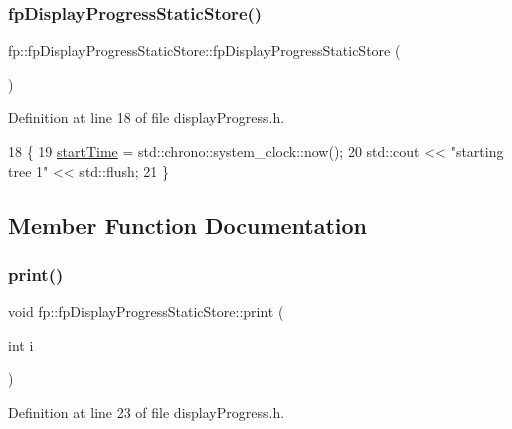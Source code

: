 \subsubsection{\texorpdfstring{fp\+Display\+Progress\+Static\+Store()}{fpDisplayProgressStaticStore()}}
{\footnotesize\ttfamily fp\+::fp\+Display\+Progress\+Static\+Store\+::fp\+Display\+Progress\+Static\+Store (\begin{DoxyParamCaption}{ }\end{DoxyParamCaption})\hspace{0.3cm}{\ttfamily [inline]}}



Definition at line 18 of file display\+Progress.\+h.


\begin{DoxyCode}
18                                           \{
19                 \hyperlink{classfp_1_1fpDisplayProgressStaticStore_aa602428554cc8543ec40617ffacd531d}{startTime} = std::chrono::system\_clock::now();
20                 std::cout << \textcolor{stringliteral}{"starting tree 1"} << std::flush;
21             \}
\end{DoxyCode}


\subsection{Member Function Documentation}
\mbox{\label{classfp_1_1fpDisplayProgressStaticStore_a9b2ab53929032183e681157515cf5313}} 
\subsubsection{\texorpdfstring{print()}{print()}}
{\footnotesize\ttfamily void fp\+::fp\+Display\+Progress\+Static\+Store\+::print (\begin{DoxyParamCaption}\item[{int}]{i }\end{DoxyParamCaption})\hspace{0.3cm}{\ttfamily [inline]}}



Definition at line 23 of file display\+Progress.\+h.


